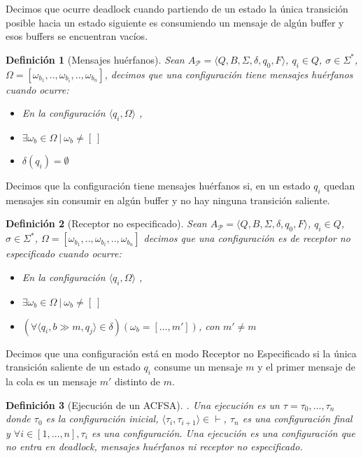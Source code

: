 \documentclass[paper=a4, fontsize=11pt, spanish]{scrartcl} %
\numberwithin{equation}{section} %
\numberwithin{figure}{section} %
\numberwithin{table}{section} %
\newtheorem{definition}{Definición}
\begin{document}
Decimos que ocurre deadlock cuando partiendo de un estado la única transición posible hacia un estado siguiente es consumiendo un mensaje de algún buffer y esos buffers se encuentran vacíos.  \\

\begin{definition}[Mensajes huérfanos]Sean $A_\mathcal{P} = \langle Q, B, \Sigma, \delta, q_0, F\rangle$, $q_{i} \in Q$, $\sigma \in \Sigma^*$,  $\Omega = [ \omega_{b_1},..,\omega_{b_i},..,\omega_{b_n} ]$, decimos que una configuración tiene mensajes huérfanos cuando ocurre:
\begin{itemize}
\item En la configuración $\langle q_i, \Omega \rangle$ ,

\item $ \exists \omega_{b} \in \Omega \ | \ \omega_b \neq [\ ] $

\item $ \delta(q_i) = \emptyset  $
\end{itemize}
\end{definition}

Decimos que la configuración tiene mensajes huérfanos si, en un estado $q_i$  quedan mensajes sin consumir en algún buffer y no hay ninguna transición saliente. 


\begin{definition}[Receptor no especificado]Sean $A_\mathcal{P} = \langle Q, B, \Sigma, \delta, q_0, F\rangle$, $q_{i} \in Q$, $\sigma \in \Sigma^*$,  $\Omega = [ \omega_{b_1},..,\omega_{b_i},..,\omega_{b_n} ]$ decimos que una configuración es de receptor no especificado cuando ocurre:
\begin{itemize}\item En la configuración $\langle q_i, \Omega \rangle$ ,

\item $ \exists \omega_{b} \in \Omega \ | \ \omega_b \neq [\ ] $

\item  $ \left(\forall \langle q_i, b \gg m, q_j \rangle \in \delta \right) \left(\omega_b = [ \ldots, m' ] \right)$, con $m' \neq m$
\end{itemize}
\end{definition}
Decimos que una configuración está en modo Receptor no Especificado si la única transición saliente de un estado $q_i$ consume un mensaje $m$ y el primer mensaje de la cola es un mensaje $m'$ distinto de $m$.

\begin{definition}[Ejecución de un ACFSA]. Una ejecución es un $ \tau = \tau_0, \ldots,\tau_n $ donde $\tau_0$ es la configuración inicial, $\langle \tau_i, \tau_{i+1} \rangle \in \vdash$, $\tau_n$ es una configuración final y $ \forall i \in [1, \ldots, n], \tau_i$ es una configuración. Una ejecución es una configuración que no entra en deadlock, mensajes huérfanos ni receptor no especificado.
\end{definition}
\end{document}
